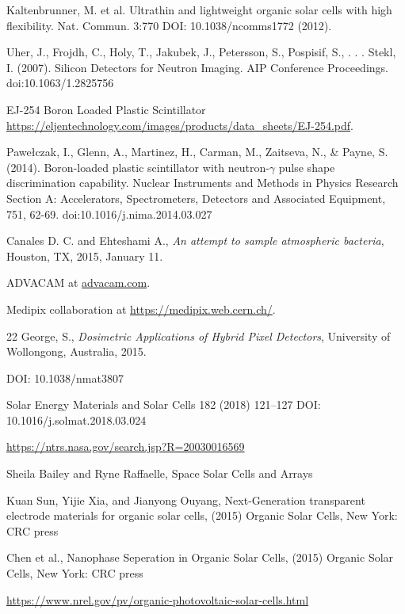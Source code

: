 \begin{thebibliography}{9}
  Kaltenbrunner, M. et al. Ultrathin and lightweight organic solar cells with high flexibility. Nat. Commun. 3:770 DOI: 10.1038/ncomms1772 (2012).

  Uher, J., Frojdh, C., Holy, T., Jakubek, J., Petersson, S., Pospisif, S., . . . Stekl, I. (2007). Silicon Detectors for Neutron Imaging. AIP Conference Proceedings. doi:10.1063/1.2825756

  EJ-254 Boron Loaded Plastic Scintillator \url{https://eljentechnology.com/images/products/data_sheets/EJ-254.pdf}.

  Pawełczak, I., Glenn, A., Martinez, H., Carman, M., Zaitseva, N., \& Payne, S. (2014). Boron-loaded plastic scintillator with neutron-$\gamma$ pulse shape discrimination capability. Nuclear Instruments and Methods in Physics Research Section A: Accelerators, Spectrometers, Detectors and Associated Equipment, 751, 62-69. doi:10.1016/j.nima.2014.03.027
  
 Canales D. C. and Ehteshami A., \textit{An attempt to sample atmospheric bacteria}, Houston, TX, 2015, January 11.

  ADVACAM at \url{advacam.com}.

  Medipix collaboration at \url{https://medipix.web.cern.ch/}.
  
 22
  George, S., \textit{Dosimetric Applications of Hybrid Pixel Detectors}, University of Wollongong, Australia, 2015.
  
  DOI: 10.1038/nmat3807 
  
  Solar Energy Materials and Solar Cells 182 (2018) 121–127
DOI: 10.1016/j.solmat.2018.03.024

\url{https://ntrs.nasa.gov/search.jsp?R=20030016569}

Sheila Bailey and Ryne Raffaelle, Space Solar Cells and Arrays

Kuan Sun, Yijie Xia, and Jianyong Ouyang, Next-Generation transparent electrode materials for organic solar cells, (2015) Organic Solar Cells, New York: CRC press

Chen et al., Nanophase Seperation in Organic Solar Cells, (2015) Organic Solar Cells, New York: CRC press

\url{https://www.nrel.gov/pv/organic-photovoltaic-solar-cells.html}


\end{thebibliography}
